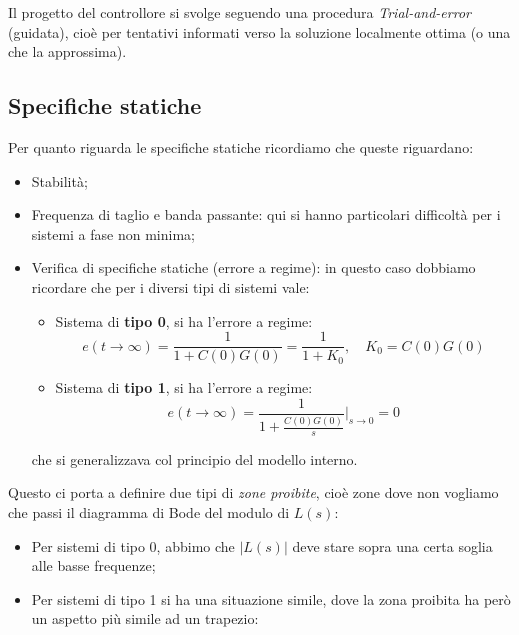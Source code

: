 \documentclass[a4paper,11pt]{article}
\begin{document}
Il progetto del controllore si svolge seguendo una procedura \textit{Trial-and-error} (guidata), cioè per tentativi informati verso la soluzione localmente ottima (o una che la approssima).

\subsection{Specifiche statiche}
Per quanto riguarda le specifiche statiche ricordiamo che queste riguardano:
\begin{itemize}
	\item Stabilità;
	\item Frequenza di taglio e banda passante: qui si hanno particolari difficoltà per i sistemi a fase non minima;
	\item Verifica di specifiche statiche (errore a regime): in questo caso dobbiamo ricordare che per i diversi tipi di sistemi vale:
		\begin{itemize}
			\item Sistema di \textbf{tipo 0}, si ha l'errore a regime: 
				$$e(t\rightarrow\infty) = \frac{1}{1 + C(0)G(0)} = \frac{1}{1 + K_0}, \quad K_0 = C(0) G(0)$$
			\item Sistema di \textbf{tipo 1}, si ha l'errore a regime: $$e(t\rightarrow\infty) = \frac{1}{1 + \frac{C(0)G(0)}{s}} \Big|_{s\rightarrow 0} = 0$$
		\end{itemize}
		che si generalizzava col principio del modello interno.
\end{itemize}

Questo ci porta a definire due tipi di \textit{zone proibite}, cioè zone dove non vogliamo che passi il diagramma di Bode del modulo di $L(s)$:
\begin{itemize}
	\item Per sistemi di tipo 0, abbimo che $|L(s)|$ deve stare sopra una certa soglia alle basse frequenze;
	\item Per sistemi di tipo 1 si ha una situazione simile, dove la zona proibita ha però un aspetto più simile ad un trapezio:
\end{itemize}
\end{document}
